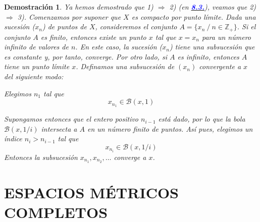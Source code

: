 \documentclass[12pt,twoside]{report}
\newcommand\mc[1]{\mathcal{#1}}
\theoremstyle{azul}
\newtheorem*{demx}{Demostración}
\theoremstyle{azul2}
\theoremstyle{plain}
\theoremstyle{definition}
\theoremstyle{remark}
\begin{document}
\begin{demx}
Ya hemos demostrado que 1) $\Rightarrow$ 2) (en \hyperref[lim]{\textcolor{blue}{\textbf{8.3.}}}), veamos que 2) $\Rightarrow$ 3). Comenzamos por suponer que $X$ es compacto por punto límite. Dada una sucesión ($x_n$) de puntos de $X$, consideremos el conjunto $A=\{x_n \: / \: n \in \mathbb{Z_+}\}$. Si el conjunto $A$ es finito, entonces existe un punto $x$ tal que $x=x_n$ para un n{\'u}mero infinito de valores de $n$. En este caso, la sucesión ($x_n$) tiene una subsucesión que es constante y, por tanto, converge. Por otro lado, si $A$ es infinito, entonces $A$ tiene un punto límite $x$. Definamos una subsucesión de $(x_n)$ convergente a $x$ del siguiente modo: 

Elegimos $n_1$ tal que 
$$x_{n_1} \in \mc{B}(x,1)$$

Supongamos entonces que el entero positivo $n_{i-1}$ está dado, por lo que la bola $\mc{B}(x, 1/i)$ intersecta a $A$ en un n{\'u}mero finito de puntos. Así pues, elegimos un índice $n_i > n_{i-1}$ tal que 
$$x_{n_i} \in \mc{B}(x, 1/i)$$
Entonces la subsucesión $x_{n_1}, x_{n_2}, \ldots $ converge a $x$.
\end{demx}
\chapter{ESPACIOS M{\'E}TRICOS COMPLETOS}
\end{document}
